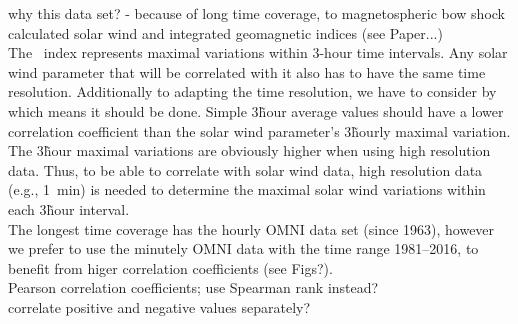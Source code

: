 why this data set? - because of long time coverage, to magnetospheric bow shock calculated solar wind and integrated geomagnetic indices (see Paper...)\\

The \Kp{}~index represents maximal variations within 3-hour time intervals. Any solar wind parameter that will be correlated with it also has to have the same time resolution. Additionally to adapting the time resolution, we have to consider by which means it should be done. Simple 3\~hour average values should have a lower correlation coefficient than the solar wind parameter's 3\~hourly maximal variation.\\

The 3\~hour maximal variations are obviously higher when using high resolution data. Thus, to be able to correlate \Kp{} with solar wind data, high resolution data (e.g., 1~min) is needed to determine the maximal solar wind variations within each 3\~hour interval.\\

The longest time coverage has the hourly OMNI data set (since 1963), however we prefer to use the minutely OMNI data with the time range 1981--2016, to benefit from higer correlation coefficients (see Figs?).\\


Pearson correlation coefficients; use Spearman rank instead?\\
correlate positive and negative values separately?\\

